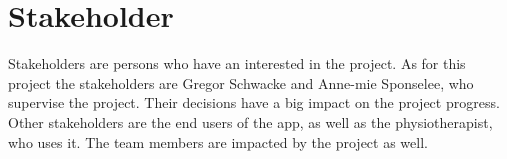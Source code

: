 \section{Stakeholder}


Stakeholders are persons who have an interested in the project. As for this project the stakeholders are Gregor Schwacke and Anne-mie Sponselee, who supervise the project. Their decisions have a big impact on the project progress.
Other stakeholders are the end users of the app, as well as the physiotherapist, who uses it. The team members are impacted by the project as well. 